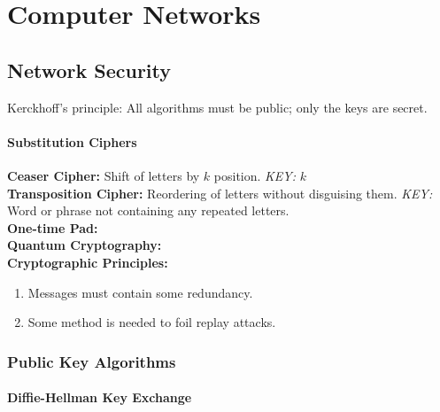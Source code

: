\documentclass[a4paper,oneside]{book}
\begin{document}
\part{Computer Networks}
\chapter{Network Security}
\begin{definition}
Kerckhoff's principle: All algorithms must be public; only the keys are secret.
\end{definition}
\subsection{Substitution Ciphers}
\textbf{Ceaser Cipher:} Shift of letters by $k$ position. \textit{KEY:	} $k$\\
\textbf{Transposition Cipher:} Reordering of letters without disguising them. \textit{KEY: }  Word or phrase not containing any repeated letters. \\
\textbf{One-time Pad:} \\
\textbf{Quantum Cryptography:}\\
\textbf{Cryptographic Principles:}
\begin{enumerate}
\item Messages must contain some redundancy.
\item  Some method is needed to foil replay attacks.
\end{enumerate}
\section{Public Key Algorithms}
\subsection{Diffie-Hellman Key Exchange}
\end{document}
